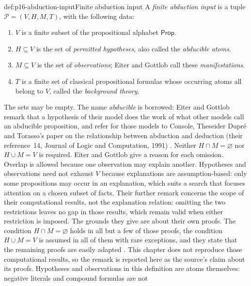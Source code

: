 \begin{hbdefinition}{def:p16-abduction-input}{Finite abduction input}
A \emph{finite abduction input} is a tuple
\(\mathcal P=(V,H,M,T)\), with the following data:
\begin{enumerate}
\item \(V\) is a finite subset of the propositional alphabet \(\mathsf{Prop}\).
\item \(H\subseteq V\) is the set of \emph{permitted hypotheses}, also
      called the \emph{abducible atoms}.
\item \(M\subseteq V\) is the set of \emph{observations}; Eiter and
      Gottlob call these \emph{manifestations}.
\item \(T\) is a finite set of classical propositional formulas whose
      occurring atoms all belong to \(V\), called the \emph{background
      theory}.
\end{enumerate}
The sets may be empty. The name \emph{abducible} is borrowed: Eiter and
Gottlob remark that a hypothesis of their model does the work of what
other models call an abducible proposition, and refer for those models to
Console, Theseider Dupr\'e and Torasso's paper on the relationship between
abduction and deduction (their reference~14, Journal of Logic and
Computation, 1991)
\cite[after def.~2.2, manuscript p.~10, and reference list, manuscript p.~41]{EiterGottlobAbductionManuscript}.
Neither \(H\cap M=\varnothing\) nor
\(H\cup M=V\) is required. Eiter and Gottlob give a reason for each
omission. Overlap is allowed because one observation may explain another.
Hypotheses and observations need not exhaust \(V\) because explanations
are assumption-based: only some propositions may occur in an explanation,
which suits a search that focuses attention on a chosen subset of facts.
Their further remark concerns the scope of their computational results,
not the explanation relation: omitting the two restrictions leaves no gap
in those results, which remain valid when either restriction is imposed.
The grounds they give are about their own proofs. The condition
\(H\cap M=\varnothing\) holds in all but a few of those proofs, the
condition \(H\cup M=V\) is assumed in all of them with rare exceptions,
and they state that the remaining proofs are easily adapted
\cite[after def.~2.2, manuscript p.~10]{EiterGottlobAbductionManuscript}.
This chapter does not reproduce those computational results, so the remark
is reported here as the source's claim about its proofs.
Hypotheses and observations in this definition
are atoms themselves: negative literals and compound formulas are not

\end{hbdefinition}
